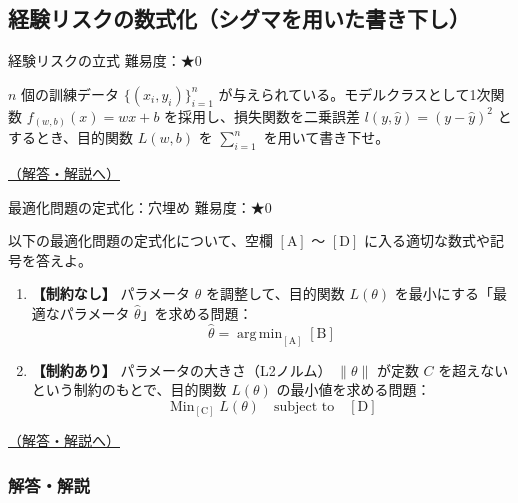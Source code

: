 \subsection{経験リスクの数式化（シグマを用いた書き下し）}\label{ux7d4cux9a13ux30eaux30b9ux30afux306eux6570ux5f0fux5316ux30b7ux30b0ux30deux3092ux7528ux3044ux305fux66f8ux304dux4e0bux3057}

\begin{questionbox}[label=q:2-1-1]{経験リスクの立式 \hfill \normalfont \small 難易度：★0}

\(n\) 個の訓練データ \(\{(x_i, y_i)\}_{i=1}^n\)
が与えられている。モデルクラスとして1次関数 \(f_{(w,b)}(x) = wx + b\)
を採用し、損失関数を二乗誤差 \(l(y, \hat{y}) = (y - \hat{y})^2\)
とするとき、目的関数 \(L(w,b)\) を \(\sum_{i=1}^n\) を用いて書き下せ。

\hfill 

\hyperref[a:2-1-1]{（解答・解説へ）}

\end{questionbox}

\begin{questionbox}[label=q:2-1-2]{最適化問題の定式化：穴埋め \hfill \normalfont \small 難易度：★0}

以下の最適化問題の定式化について、空欄 \([\text{A}]\) 〜 \([\text{D}]\)
に入る適切な数式や記号を答えよ。

\begin{enumerate}
\def\labelenumi{\arabic{enumi}.}
\tightlist
\item
  \textbf{【制約なし】} パラメータ \(\theta\) を調整して、目的関数
  \(L(\theta)\) を最小にする「最適なパラメータ
  \(\hat{\theta}\)」を求める問題： \[
       \hat{\theta} = \mathop{\mathrm{arg\,min}}_{[\text{A}]} [\text{B}]
       \]
\item
  \textbf{【制約あり】} パラメータの大きさ（L2ノルム） \(\|\theta\|\)
  が定数 \(C\) を超えないという制約のもとで、目的関数 \(L(\theta)\)
  の最小値を求める問題： \[
       \mathop{\mathrm{Min}}_{[\text{C}]} L(\theta) \quad \text{subject to} \quad [\text{D}]
       \]
\end{enumerate}

\hfill 

\hyperref[a:2-1-2]{（解答・解説へ）}

\end{questionbox}

\subsubsection{解答・解説}\label{ux89e3ux7b54ux89e3ux8aac-3}

